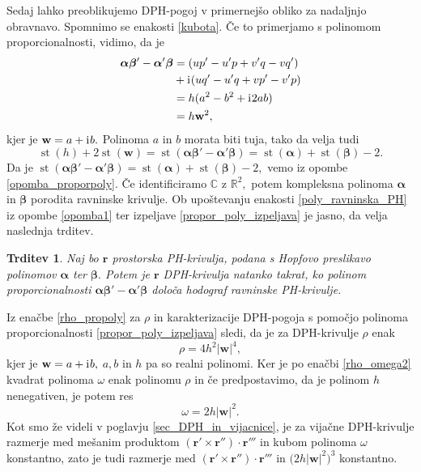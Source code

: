 \documentclass[12pt,a4paper,twoside]{article}
\newcommand{\iu}{\mathrm{i}\mkern1mu} %
\theoremstyle{definition} %
\theoremstyle{plain} %
\newtheorem{trditev}[definicija]{Trditev}
\theoremstyle{primerstyle}
\numberwithin{equation}{section}  %
\newcommand{\R}{\mathbb R}
\renewcommand{\C}{\mathbb C}
\newcommand{\rV}{\mathbf{r}}
\newcommand{\wV}{\mathbf{w}}
\newcommand{\balpha}{\boldsymbol \alpha}
\newcommand{\bbeta}{\boldsymbol \beta}
\DeclareMathOperator{\st}{st}
\begin{document}
Sedaj lahko preoblikujemo DPH-pogoj v primernejšo obliko za nadaljnjo obravnavo. Spomnimo se enakosti \eqref{kubota}. Če to primerjamo s polinomom proporcionalnosti, vidimo, da je
\begin{align}
	\balpha\bbeta'-\balpha'\bbeta&=(up'-u'p+v'q-vq')\nonumber \\
	&+\iu(uq'-u'q+vp'-v'p) \label{propor_poly_izpeljava} \\
	&=h(a^2-b^2+\iu 2ab) \nonumber \\
	&=h\wV^2, \nonumber
\end{align}
kjer je $\wV=a+\iu b.$ Polinoma $a$ in $b$ morata biti tuja, tako da velja tudi
\begin{equation}
	\st(h)+2\st(\wV)=\st(\balpha\bbeta'-\balpha'\bbeta)=\st(\balpha)+\st(\bbeta)-2.
	\end{equation}
Da je $\st(\balpha\bbeta'-\balpha'\bbeta)=\st(\balpha)+\st(\bbeta)-2,$ vemo iz opombe \ref{opomba_proporpoly}. Če identificiramo $\C$ z $\R^2,$ potem kompleksna polinoma $\balpha$ in $\bbeta$ porodita ravninske krivulje. Ob upoštevanju enakosti \eqref{poly_ravninska_PH} iz opombe \ref{opomba1} ter izpeljave \eqref{propor_poly_izpeljava} je jasno, da velja naslednja trditev.
\begin{trditev}
	Naj bo $\rV$ prostorska PH-krivulja, podana s Hopfovo preslikavo polinomov $\balpha$ ter $\bbeta.$ Potem je $\rV$ DPH-krivulja natanko takrat, ko polinom proporcionalnosti $\balpha\bbeta'-\balpha'\bbeta$ določa hodograf ravninske PH-krivulje.
\end{trditev}

Iz enačbe \eqref{rho_propoly} za $\rho$ in karakterizacije DPH-pogoja s pomočjo polinoma proporcionalnosti \eqref{propor_poly_izpeljava} sledi, da je za DPH-krivulje $\rho$ enak $$\rho=4h^2|\wV|^4,$$ kjer je $\wV=a+\iu b,$ $a,b$ in $h$ pa so realni polinomi. Ker je po enačbi \eqref{rho_omega2} kvadrat polinoma $\omega$ enak polinomu $\rho$ in če predpostavimo, da je polinom $h$ nenegativen, je potem res $$\omega=2h|\wV|^2.$$ Kot smo že videli v poglavju \ref{sec_DPH_in_vijacnice}, je za vijačne DPH-krivulje razmerje med mešanim produktom $(\rV'\times\rV'')\cdot\rV'''$ in kubom polinoma $\omega$ konstantno, zato je tudi razmerje med $(\rV'\times\rV'')\cdot\rV'''$ in $\big(2h|\wV|^2\big)^3$ konstantno.
\end{document}
